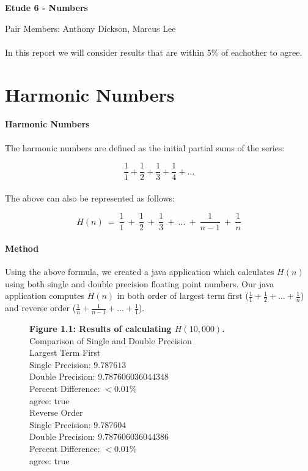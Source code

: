 \documentclass[12pt]{article}
\begin{document}
	
\begin{center}
\begin{LARGE}
\textbf{Etude 6 - Numbers}\\
\end{LARGE}
Pair Members: Anthony Dickson, Marcus Lee
\end{center}

\paragraph{} In this report we will consider results that are within 5\% of eachother to agree. 

\section{Harmonic Numbers}
\paragraph{Harmonic Numbers}
	The harmonic numbers are defined as the initial partial sums of the series:
	
	{\large $$\frac{1}{1} + \frac{1}{2} + \frac{1}{3} + \frac{1}{4} + \ldots$$}\\
	The above can also be represented as follows:
	
	{\large $$H(n)\ = \ \frac{1}{1} \ + \ \frac{1}{2} \ + \ \frac{1}{3} \ + \ \ldots \ +  \ \frac{1}{n-1} \ + \ \frac{1}{n}$$}

\paragraph{Method}
	Using the above formula, we created a java application which calculates $H(n)$ using both single and double precision floating point numbers. Our java application computes $H(n)$ in both order of largest term first ($\frac{1}{1} + \frac{1}{2} +  \ldots + \frac{1}{n}$) and reverse order ($\frac{1}{n} + \frac{1}{n - 1} +  \ldots + \frac{1}{1}$). 

\begin{figure}[h]
	\textbf{Figure 1.1: Results of calculating $H(10,000)$.}\\
	
	Comparison of Single and Double Precision\\
	Largest Term First\\
	Single Precision: $9.787613$\\
	Double Precision: $9.787606036044348$\\
	Percent Difference: $< 0.01\%$\\
	agree: true\\
	
	Reverse Order\\
	Single Precision: $9.787604$\\
	Double Precision: $9.787606036044386$\\
	Percent Difference: $< 0.01\%$\\
	agree: true\\
\end{figure}
\end{document}

